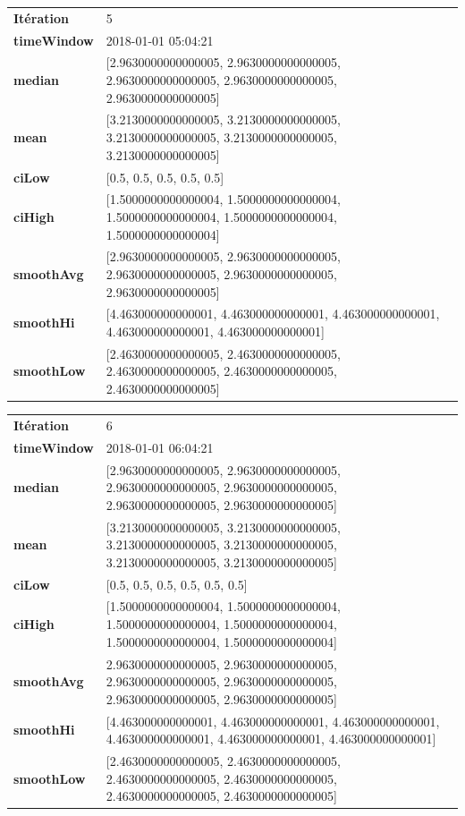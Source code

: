 \begin{table}[H]
	\centering
	\begin{tabularx}{\textwidth}{lX}
		\textbf{Itération}& 5\\
		\textbf{timeWindow}	 &   2018-01-01 05:04:21 \\
		\textbf{median} &[2.9630000000000005, 2.9630000000000005, 2.9630000000000005, 2.9630000000000005, 2.9630000000000005] \\ 
		\textbf{mean} &  [3.2130000000000005, 3.2130000000000005, 3.2130000000000005, 3.2130000000000005, 3.2130000000000005] \\
		\textbf{ciLow} &  [0.5, 0.5, 0.5, 0.5, 0.5] \\
		\textbf{ciHigh}& [1.5000000000000004, 1.5000000000000004, 1.5000000000000004, 1.5000000000000004, 1.5000000000000004]  \\
		\textbf{smoothAvg} & [2.9630000000000005, 2.9630000000000005, 2.9630000000000005, 2.9630000000000005, 2.9630000000000005]\\
		\textbf{smoothHi} & [4.463000000000001, 4.463000000000001, 4.463000000000001, 4.463000000000001, 4.463000000000001] \\
		\textbf{smoothLow} & [2.4630000000000005, 2.4630000000000005, 2.4630000000000005, 2.4630000000000005, 2.4630000000000005]\\ 
	\end{tabularx}
\end{table}

\begin{table}[H]
	\centering
	\begin{tabularx}{\textwidth}{lX}
		\textbf{Itération}& 6\\
		\textbf{timeWindow}	 & 2018-01-01 06:04:21   \\
		\textbf{median} & [2.9630000000000005, 2.9630000000000005, 2.9630000000000005, 2.9630000000000005, 2.9630000000000005, 2.9630000000000005] 
		\\ 
		\textbf{mean} &  [3.2130000000000005, 3.2130000000000005,  3.2130000000000005, 3.2130000000000005, 3.2130000000000005, 3.2130000000000005] 
		\\
		\textbf{ciLow} & [0.5, 0.5, 0.5, 0.5, 0.5, 0.5]  \\
		\textbf{ciHigh}& [1.5000000000000004, 1.5000000000000004, 1.5000000000000004, 1.5000000000000004, 1.5000000000000004, 1.5000000000000004] 
		\\
		\textbf{smoothAvg} & 2.9630000000000005, 2.9630000000000005, 2.9630000000000005, 2.9630000000000005, 2.9630000000000005, 2.9630000000000005] 
		\\
		\textbf{smoothHi} &  [4.463000000000001, 4.463000000000001, 4.463000000000001, 4.463000000000001, 4.463000000000001, 4.463000000000001] 
		\\
		\textbf{smoothLow} &  [2.4630000000000005, 2.4630000000000005, 2.4630000000000005, 2.4630000000000005, 2.4630000000000005, 2.4630000000000005]
		\\ 
	\end{tabularx} 
\end{table}


